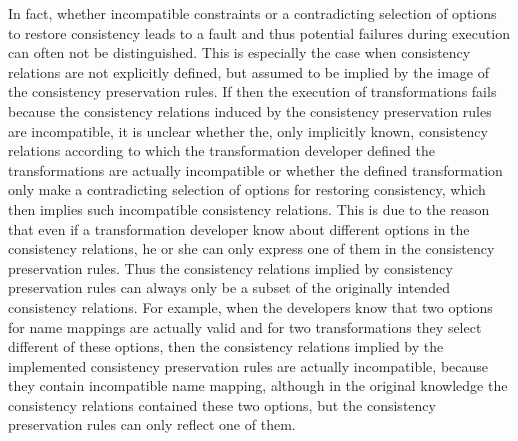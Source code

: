 In fact, whether incompatible constraints or a contradicting selection of options to restore consistency leads to a fault and thus potential failures during execution can often not be distinguished.
This is especially the case when consistency relations are not explicitly defined, but assumed to be implied by the image of the consistency preservation rules.
If then the execution of transformations fails because the consistency relations induced by the consistency preservation rules are incompatible, it is unclear whether the, only implicitly known, consistency relations according to which the transformation developer defined the transformations are actually incompatible or whether the defined transformation only make a contradicting selection of options for restoring consistency, which then implies such incompatible consistency relations.
This is due to the reason that even if a transformation developer know about different options in the consistency relations, he or she can only express one of them in the consistency preservation rules.
Thus the consistency relations implied by consistency preservation rules can always only be a subset of the originally intended consistency relations.
For example, when the developers know that two options for name mappings are actually valid and for two transformations they select different of these options, then the consistency relations implied by the implemented consistency preservation rules are actually incompatible, because they contain incompatible name mapping, although in the original knowledge the consistency relations contained these two options, but the consistency preservation rules can only reflect one of them.



